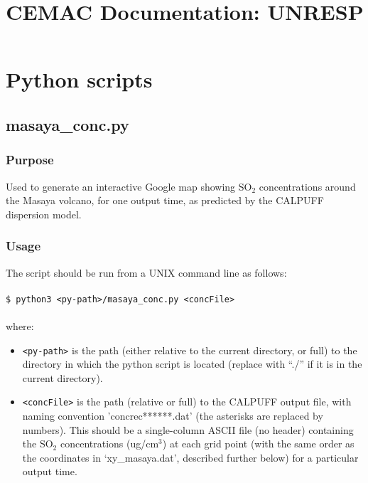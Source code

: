 \documentclass[10pt,a4paper]{article}
\title{CEMAC Documentation: UNRESP}
\newcommand\tab[1][0.5cm]{\hspace*{#1}}
\begin{document}
\maketitle
\tableofcontents

\section{Python scripts}

\subsection{masaya\_conc.py}

\subsubsection{Purpose}

Used to generate an interactive Google map showing SO$_2$ concentrations around the Masaya volcano, for one output time, as predicted by the CALPUFF dispersion model.

\subsubsection{Usage}
The script should be run from a UNIX command line as follows:\\\\
\tab \texttt{\$ python3 <py-path>/masaya\_conc.py <concFile>}\\\\
where:
\begin{itemize}
\item \texttt{<py-path>} is the path (either relative to the current directory, or full) to the directory in which the python script is located (replace with “./” if it is in the current directory).
\item \texttt{<concFile>} is the path (relative or full) to the CALPUFF output file, with naming convention 'concrec******.dat' (the asterisks are replaced by numbers). This should be a single-column ASCII file (no header) containing the SO$_2$ concentrations (ug/cm$^3$) at each grid point (with the same order as the coordinates in `xy\_masaya.dat', described further below) for a particular output time.
\end{itemize}
\end{document}
